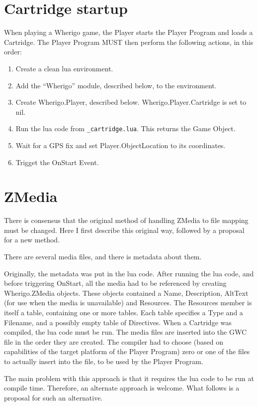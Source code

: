 \documentclass{article}
\begin{document}
\section{Cartridge startup}
When playing a Wherigo game, the Player starts the Player Program and loads a
Cartridge. The Player Program MUST then perform the following actions, in this
order:

\begin{enumerate}
\item Create a clean lua environment.
\item Add the ``Wherigo'' module, described below, to the environment.
\item Create Wherigo.Player, described below. Wherigo.Player.Cartridge is set to nil.
\item Run the lua code from \verb-_cartridge.lua-. This returns the Game Object.
\item Wait for a GPS fix and set Player.ObjectLocation to its coordinates.
\item Trigget the OnStart Event.
\end{enumerate}

\section{ZMedia}
There is consensus that the original method of handling ZMedia to file mapping
must be changed. Here I first describe this original way, followed by a
proposal for a new method.

There are several media files, and there is metadata about them.

Originally, the metadata was put in the lua code. After running the lua code,
and before triggering OnStart, all the media had to be referenced by creating
Wherigo.ZMedia objects. These objects contained a Name, Description, AltText
(for use when the media is unavailable) and Resources. The Resources member is
itself a table, containing one or more tables. Each table specifies a Type and
a Filename, and a possibly empty table of Directives. When a Cartridge was
compiled, the lua code must be run. The media files are inserted into the GWC
file in the order they are created. The compiler had to choose (based on
capabilities of the target platform of the Player Program) zero or one of the
files to actually insert into the file, to be used by the Player Program.

The main problem with this approach is that it requires the lua code to be run
at compile time. Therefore, an alternate approach is welcome. What follows is a
proposal for such an alternative.
\end{document}
